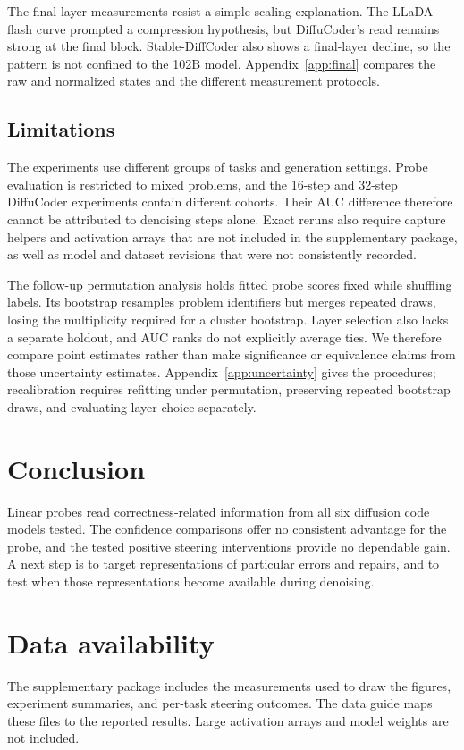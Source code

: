 \documentclass[11pt,letterpaper]{article}
\begin{document}
The final-layer measurements resist a simple scaling explanation. The LLaDA-flash curve prompted a compression hypothesis, but DiffuCoder's read remains strong at the final block. Stable-DiffCoder also shows a final-layer decline, so the pattern is not confined to the 102B model. Appendix~\ref{app:final} compares the raw and normalized states and the different measurement protocols.

\subsection{Limitations}\label{sec:limits}

The experiments use different groups of tasks and generation settings. Probe evaluation is restricted to mixed problems, and the 16-step and 32-step DiffuCoder experiments contain different cohorts. Their AUC difference therefore cannot be attributed to denoising steps alone. Exact reruns also require capture helpers and activation arrays that are not included in the supplementary package, as well as model and dataset revisions that were not consistently recorded.

The follow-up permutation analysis holds fitted probe scores fixed while shuffling labels. Its bootstrap resamples problem identifiers but merges repeated draws, losing the multiplicity required for a cluster bootstrap. Layer selection also lacks a separate holdout, and AUC ranks do not explicitly average ties. We therefore compare point estimates rather than make significance or equivalence claims from those uncertainty estimates. Appendix~\ref{app:uncertainty} gives the procedures; recalibration requires refitting under permutation, preserving repeated bootstrap draws, and evaluating layer choice separately.

\section{Conclusion}\label{sec:conclusion}

Linear probes read correctness-related information from all six diffusion code models tested. The confidence comparisons offer no consistent advantage for the probe, and the tested positive steering interventions provide no dependable gain. A next step is to target representations of particular errors and repairs, and to test when those representations become available during denoising.

\section*{Data availability}
The supplementary package includes the measurements used to draw the figures, experiment summaries, and per-task steering outcomes. The data guide maps these files to the reported results. Large activation arrays and model weights are not included.
\end{document}
